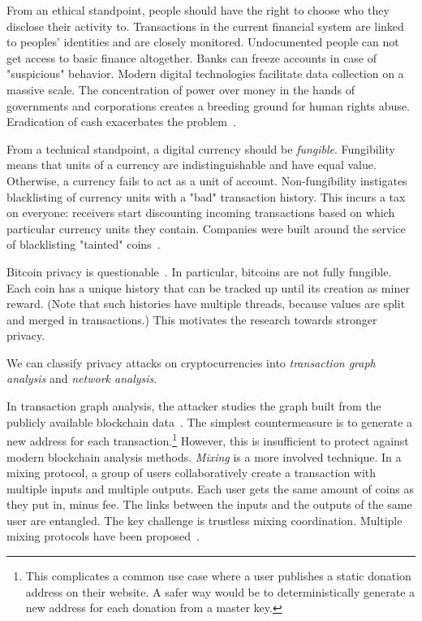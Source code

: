 From an ethical standpoint, people should have the right to choose who they disclose their activity to.
Transactions in the current financial system are linked to peoples' identities and are closely monitored.
Undocumented people can not get access to basic finance altogether.
Banks can freeze accounts in case of "suspicious" behavior.
Modern digital technologies facilitate data collection on a massive scale.
The concentration of power over money in the hands of governments and corporations creates a breeding ground for human rights abuse.
Eradication of cash exacerbates the problem~\cite{Brito2019}.

From a technical standpoint, a digital currency should be \textit{fungible}.
Fungibility means that units of a currency are indistinguishable and have equal value.
Otherwise, a currency fails to act as a unit of account.
Non-fungibility instigates blacklisting of currency units with a "bad" transaction history.
This incurs a tax on everyone: receivers start discounting incoming transactions based on which particular currency units they contain.
Companies were built around the service of blacklisting "tainted" coins~\cite{Elliptic, Chainalysis}.

Bitcoin privacy is questionable~\cite{Reid2011,Androulaki2013}.
In particular, bitcoins are not fully fungible.
Each coin has a unique history that can be tracked up until its creation as miner reward.
(Note that such histories have multiple threads, because values are split and merged in transactions.)
This motivates the research towards stronger privacy.

We can classify privacy attacks on cryptocurrencies into \textit{transaction graph analysis} and \textit{network analysis}.

In transaction graph analysis, the attacker studies the graph built from the publicly available blockchain data~\cite{Meiklejohn2013, Ober2013, Ron2013}.
The simplest countermeasure is to generate a new address for each transaction.\footnote{This complicates a common use case where a user publishes a static donation address on their website. A safer way would be to deterministically generate a new address for each donation from a master key.}
However, this is insufficient to protect against modern blockchain analysis methods.
\textit{Mixing} is a more involved technique.
In a mixing protocol, a group of users collaboratively create a transaction with multiple inputs and multiple outputs.
Each user gets the same amount of coins as they put in, minus fee.
The links between the inputs and the outputs of the same user are entangled.
The key challenge is trustless mixing coordination.
Multiple mixing protocols have been proposed~\cite{Maxwell2013, Bonneau2014, Ruffing2014, Valenta2015}.

